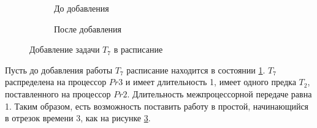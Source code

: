 \begin{figure}[!htbp]
    \centering
    \small
    \begin{subfigure}{0.49\textwidth}
        \caption{До добавления}
        \label{fig:sched-before-addition}
    \end{subfigure}
    \hfill
    \begin{subfigure}{0.49\textwidth}
        \caption{После добавления}
        \label{fig:sched-after-addition}
    \end{subfigure}
    \caption{Добавление задачи $T_7$ в расписание}
\end{figure}

Пусть до добавления работы $T_7$ расписание находится в состоянии \ref{fig:sched-before-addition}. $T_7$ распределена на процессор $Pr3$ и имеет длительность 1, имеет одного предка $T_2$, поставленного на процессор $Pr2$. Длительность межпроцессорной передаче равна 1. Таким образом, есть возможность поставить работу в простой, начинающийся в отрезок времени 3, как на рисунке \ref{fig:sched-after-addition}.